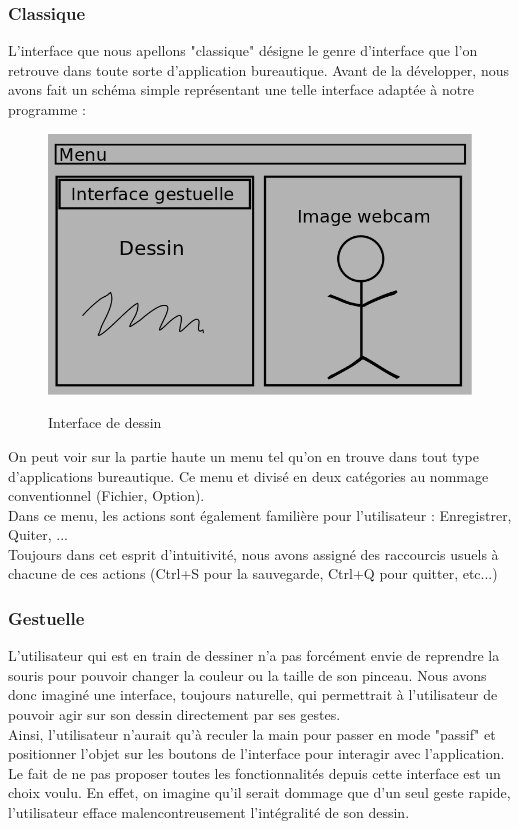 \documentclass{report}
\begin{document}
			\subsubsection{Classique}
				L'interface que nous apellons "classique" désigne le genre d'interface que l'on retrouve dans toute sorte d'application bureautique. Avant de la développer, nous avons fait un schéma simple représentant une telle interface adaptée à notre programme : \\
			\begin{figure}[!h]
						\centering
						\includegraphics[scale=0.4]{../images/interface.png}\\
						\caption{Interface de dessin}
						\label{Interface de dessin}
			\end{figure}
			
			On peut voir sur la partie haute un menu tel qu'on en trouve dans tout type d'applications bureautique. Ce menu et divisé en deux catégories au nommage conventionnel (Fichier, Option). \\
			Dans ce menu, les actions sont également familière pour l'utilisateur : Enregistrer, Quiter, ... \\
			Toujours dans cet esprit d'intuitivité, nous avons assigné des raccourcis usuels à chacune de ces actions (Ctrl+S pour la sauvegarde, Ctrl+Q pour quitter, etc...)
			
			\subsubsection{Gestuelle}
				L'utilisateur qui est en train de dessiner n'a pas forcément envie de reprendre la souris pour pouvoir changer la couleur ou la taille de son pinceau. Nous avons donc imaginé une interface, toujours naturelle, qui permettrait à l'utilisateur de pouvoir agir sur son dessin directement par ses gestes. \\
				Ainsi, l'utilisateur n'aurait qu'à reculer la main pour passer en mode "passif" et positionner l'objet sur les boutons de l'interface pour interagir avec l'application. \\
				Le fait de ne pas proposer toutes les fonctionnalités depuis cette interface est un choix voulu. En effet, on imagine qu'il serait dommage que d'un seul geste rapide, l'utilisateur efface malencontreusement l'intégralité de son dessin. 
\end{document}
